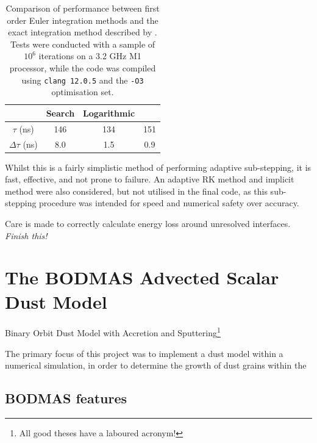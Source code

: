 \begin{table}
  \centering
  \begin{tabular}{cccc}
  \hline
  & \textbf{Search} & \textbf{Logarithmic} & \textbf{\cite{townsendExactIntegrationScheme2009}} \\ \hline
  $\tau$ (\si{\nano\second}) & 146 & 134 & 151 \\
  $\Delta \tau$ (\si{\nano\second}) & 8.0 & 1.5 & 0.9 \\ \hline
  \end{tabular}
  \caption[Cooling method performance comparison]{Comparison of performance between first order Euler integration methods and the exact integration method described by \cite{townsendExactIntegrationScheme2009}. Tests were conducted with a sample of $10^6$ iterations on a 3.2 \si{\giga\hertz} M1 processor, while the code was compiled using \texttt{clang 12.0.5} and the \texttt{-O3} optimisation set.}
  \label{tab:cooling-loop-speed-comp}
\end{table}

Whilst this is a fairly simplistic method of performing adaptive sub-stepping, it is fast, effective, and not prone to failure. An adaptive RK method and implicit method were also considered, but not utilised in the final code, as this sub-stepping procedure was intended for speed and numerical safety over accuracy.


Care is made to correctly calculate energy loss around unresolved interfaces. \textit{Finish this!}



\section{The BODMAS Advected Scalar Dust Model}
\label{sec:bodmas}

Binary Orbit Dust Model with Accretion and Sputtering\footnote{All good theses have a laboured acronym!}

The primary focus of this project was to implement a dust model within a numerical simulation, in order to determine the growth of dust grains within the 

\subsection{BODMAS features}


